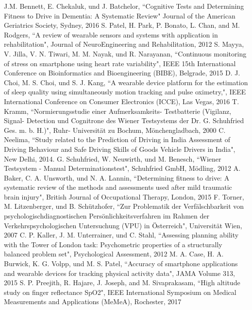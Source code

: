 \documentclass[conference]{IEEEtran}
\begin{document}
\begin{thebibliography}{00}
J.M. Bennett, E. Chekaluk, und J. Batchelor,
``Cognitive Tests and Determining Fitness to Drive in Dementia: A Systematic Review"
Journal of the American Geriatrics Society, Sydney, 2016
 S. Patel, H. Park, P. Bonato, L. Chan, and M. Rodgers, ``A review of wearable sensors and systems with application in rehabilitation", Journal of NeuroEngineering and Rehabilitation, 2012
 S. Mayya, V. Jilla, V. N. Tiwari, M. M. Nayak, und R. Narayanan, ``Continuous monitoring of stress on smartphone using heart rate variability", IEEE 15th International Conference on Bioinformatics and Bioengineering (BIBE), Belgrade, 2015
 D. J. Choi, M. S. Choi, und S. J. Kang, ``A wearable device platform for the estimation of sleep quality using simultaneously motion tracking and pulse oximetry,", IEEE International Conference on Consumer Electronics (ICCE), Las Vegas, 2016
 T. Kramm, ``Normierungsstudie einer Aufmerksamkeits- Testbatterie (Vigilanz, Signal- Detection und Cognitrone des Wiener Testsystems der Dr. G. Schuhfried Ges. m. b. H.)", Ruhr- Universität zu Bochum, Mönchengladbach, 2000
 C. Neelima, ``Study related to the Prediction of Driving in India Assessment of Driving Behaviour and Safe Driving Skills of Goods Vehicle Drivers in India", New Delhi, 2014. 
 G. Schuhfried, W. Neuwirth, und M. Benesch, ``Wiener Testsystem - Manual Determinationstest", Schuhfried GmbH, Mödling, 2012
A. Baker, C. A. Unsworth, und N. A. Lannin,
``Determining fitness to drive: A systematic review of the methods and assessments used after mild traumatic brain injury", British Journal of Occupational Therapy, London, 2015
 F. Torner, M. Litzenberger, und B. Schützhofer, ``Zur Problematik der Verfälschbarkeit von psychologischdiagnostischen Persönlichkeitsverfahren im Rahmen der Verkehrspsychologischen Untersuchung (VPU) in Österreich", Universität Wien, 2007
 C. P. Kaller, J. M. Unterrainer, und C. Stahl, ``Assessing planning ability with the Tower of London task: Psychometric properties of a structurally balanced problem set", Psychological Assessment, 2012
 M. A. Case, H. A. Burwick, K. G. Volpp, und M. S. Patel, ``Accuracy of smartphone applications and wearable devices for tracking physical activity data", JAMA Volume 313, 2015
S. P. Preejith, R. Hajare, J. Joseph, and M. Sivaprakasam, ``High altitude study on finger reflectance SpO2", IEEE International Symposium on Medical Measurements and Applications (MeMeA), Rochester, 2017

\end{thebibliography}
\end{document}
